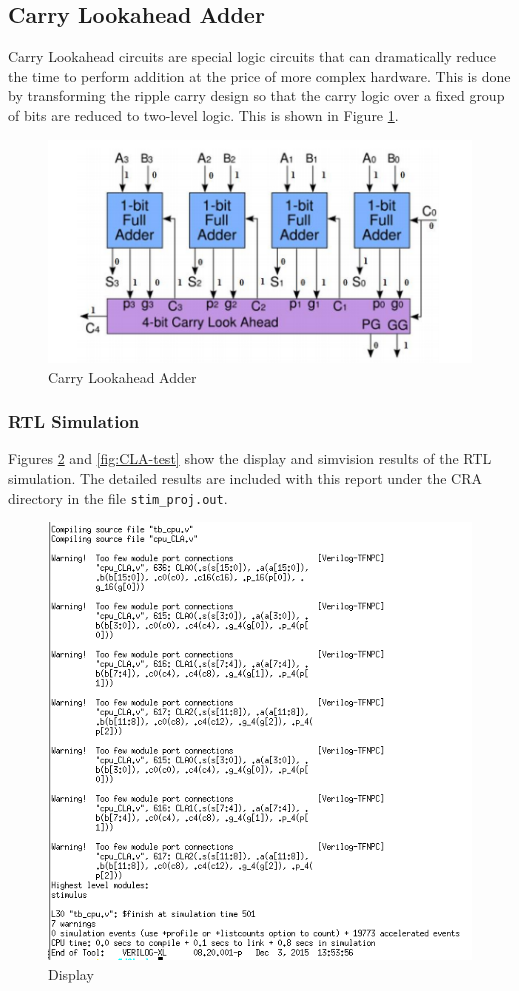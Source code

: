 \documentclass[12pt]{article}
\begin{document}
\subsection{Carry Lookahead Adder}
Carry Lookahead circuits are special logic circuits that can dramatically reduce the time to perform addition at the price of more complex hardware. This is done by transforming the ripple carry design so that the carry logic over a fixed group of bits are reduced to two-level logic. This is shown in Figure \ref{fig:carry-lookahead}.
\begin{figure}[H]
\centering
\includegraphics[width=0.7\linewidth]{carry-lookahead}
\caption{Carry Lookahead Adder}
\label{fig:carry-lookahead}
\end{figure}

\subsubsection{RTL Simulation}
Figures \ref{fig:CLA-text} and \ref{fig:CLA-test} show the display and simvision results of the RTL simulation. The detailed results are included with this report under the CRA directory in the file \texttt{stim\_proj.out}.

\begin{figure}[H]
\centering
\includegraphics[width=0.7\linewidth]{../CLA/CLA-text}
\caption{Display}
\label{fig:CLA-text}
\end{figure}
\end{document}
